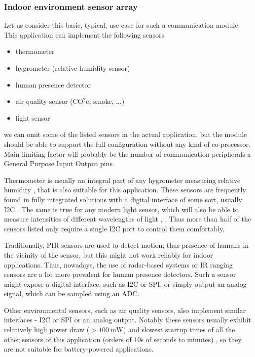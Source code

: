 \subsubsection{Indoor environment sensor array}
Let us consider this basic, typical, use-case for such a communication module. This application can implement the following sensors
\begin{itemize}
    \item thermometer
    \item hygrometer (relative humidity sensor)
    \item human presence detector
    \item air quality sensor (CO$^2$e, smoke, ...)
    \item light sensor
\end{itemize}
we can omit some of the listed sensors in the actual application, but the module should be able to support the full configuration without any kind of co-processor. Main limiting factor will probably be the number of communication peripherals a General Purpose Input Output pins.

Thermometer is usually an integral part of any hygrometer measuring relative humidity \cite{webster_humidity_1998}, that is also suitable for this application. These sensors are frequently found in fully integrated solutions with a digital interface of some sort, usually I2C \cite{bosch_sensortec_gmbh_bst-bme280-ds002pdf_2024}. The same is true for any modern light sensor, which will also be able to measure intensities of different wavelengths of light \cite{stmicroelectronics_ambient_2024}, \cite{texas_instruments_inc_light_2024}. Thus more than half of the sensors listed only require a single I2C port to control them comfortably.

Traditionally, PIR sensors are used to detect motion, thus presence of humans in the vicinity of the sensor, but this might not work reliably for indoor applications. Thus, nowadays, the use of radar-based systems \cite{infineon_technologies_presence_2024} or IR ranging sensors \cite{stmicroelectronics_human_2024} are a lot more prevalent for human presence detectors. Such a sensor might expose a digital interface, such as I2C or SPI, or simply output an analog signal, which can be sampled using an ADC.

Other environmental sensors, such as air quality sensors, also implement similar interfaces - I2C or SPI or an analog output. Notably these sensors usually exhibit relatively high power draw ($>100~\mathrm{mW}$) and slowest startup times of all the other sensors of this application (orders of 10s of seconds to minutes) \cite{amphenol_inc_mics-vz-89te_2024}, so they are not suitable for battery-powered applications.


